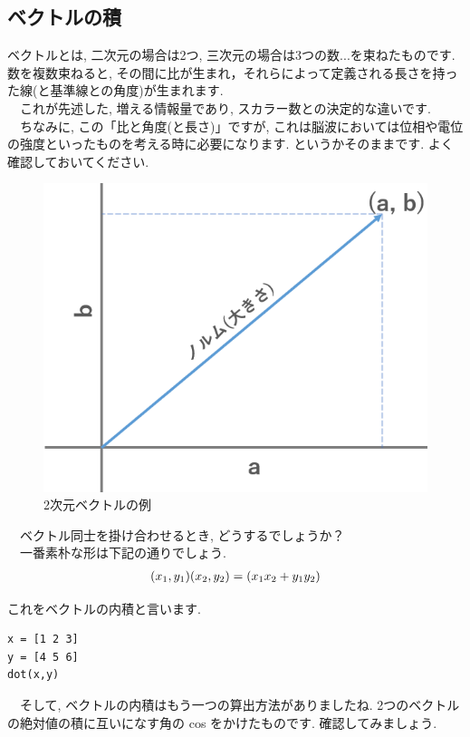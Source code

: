 \documentclass[11pt,a4paper,uplatex]{ujreport}
\begin{document}
\subsection{ベクトルの積}
ベクトルとは, 二次元の場合は2つ, 三次元の場合は3つの数...を束ねたものです. \\
数を複数束ねると, その間に比が生まれ，それらによって定義される長さを持った線(と基準線との角度)が生まれます. \\
　これが先述した, 増える情報量であり, スカラー数との決定的な違いです.\\
　ちなみに, この「比と角度(と長さ)」ですが, これは脳波においては位相や電位の強度といったものを考える時に必要になります. というかそのままです. よく確認しておいてください. 
\\

\begin{figure}[H]
\label{im:vector}
  \centering
  \includegraphics[width=120mm,bb=0 0 582 467]{../figures/vector.png}
  \caption{2次元ベクトルの例}
\end{figure}


　ベクトル同士を掛け合わせるとき, どうするでしょうか？\\
　一番素朴な形は下記の通りでしょう.\\
\begin{eqnarray}
\label{eq:veckake}
(\mathstrut x_1 , \mathstrut y_1)(\mathstrut x_2 , \mathstrut y_2 ) = (\mathstrut x_1 \mathstrut x_2 + \mathstrut y_1 \mathstrut y_2)
\end{eqnarray}

これをベクトルの内積と言います.\\
\begin{lstlisting}[caption=\ref{eq:veckake}のMATLABコード,label=sc:veckake]
x = [1 2 3]
y = [4 5 6]
dot(x,y)
\end{lstlisting}
　そして, ベクトルの内積はもう一つの算出方法がありましたね. 2つのベクトルの絶対値の積に互いになす角の cos をかけたものです. 確認してみましょう.\\
\end{document}
